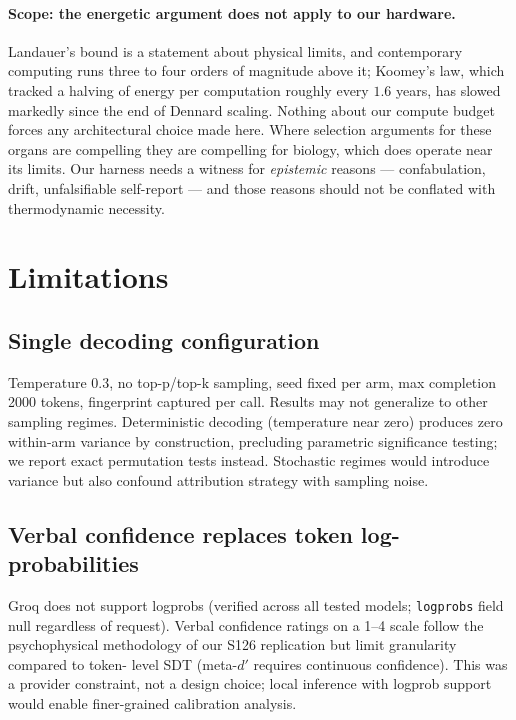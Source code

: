 \documentclass[11pt]{article}
\begin{document}
\paragraph{Scope: the energetic argument does not apply to our hardware.}
Landauer's bound is a statement about physical limits, and contemporary
computing runs three to four orders of magnitude above it; Koomey's law, which
tracked a halving of energy per computation roughly every $1.6$ years, has
slowed markedly since the end of Dennard scaling. Nothing about our compute
budget forces any architectural choice made here. Where selection arguments for
these organs are compelling they are compelling for biology, which does operate
near its limits. Our harness needs a witness for \emph{epistemic} reasons ---
confabulation, drift, unfalsifiable self-report --- and those reasons should not
be conflated with thermodynamic necessity.

\section{Limitations}\label{sec:limitations}

\subsection{Single decoding configuration}
Temperature 0.3, no top-p/top-k sampling, seed fixed per arm, max
completion 2000 tokens, fingerprint captured per call. Results may not
generalize to other sampling regimes. Deterministic decoding (temperature
near zero) produces zero within-arm variance by construction, precluding
parametric significance testing; we report exact permutation tests
instead. Stochastic regimes would introduce variance but also confound
attribution strategy with sampling noise.

\subsection{Verbal confidence replaces token log-probabilities}
Groq does not support logprobs (verified across all tested models;
\texttt{logprobs} field null regardless of request). Verbal confidence
ratings on a 1--4 scale follow the psychophysical methodology of our
S126 replication \citep{s126} but limit granularity compared to token-
level SDT (meta-$d'$ requires continuous confidence). This was a
provider constraint, not a design choice; local inference with
logprob support would enable finer-grained calibration analysis.
\end{document}
